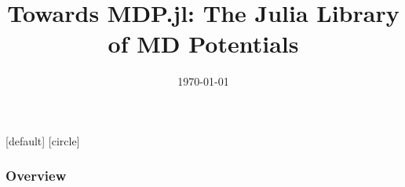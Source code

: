 \documentclass[10pt]{beamer}
\title[]{Towards MDP.jl: The Julia Library of MD Potentials}
\theoremstyle{remark}
\theoremstyle{definition}
\begin{document}
\author[Julia Lab and PSAAP-3 Team, MIT.]{
	\begin{tabular}{c} 
\end{tabular}
\vspace{-4ex}
}


\date{\today}

\begin{noheadline}
\begin{frame}\maketitle\end{frame}
\end{noheadline}

[default]
[circle]

\begin{frame}
 	\frametitle{Overview} %
 	\tableofcontents %
 \end{frame}
 
\end{document}
